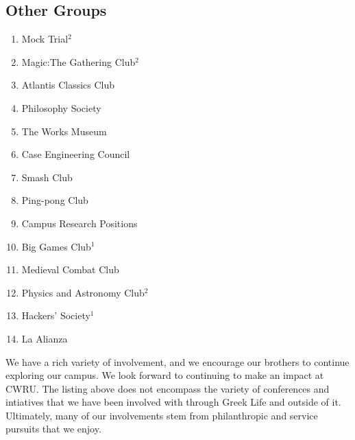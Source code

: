     \subsection*{Other Groups}
      \begin{enumerate}
	\item Mock Trial$^2$
	\item Magic:The Gathering Club$^2$
	\item Atlantis Classics Club
	\item Philosophy Society
	\item The Works Museum
	\item Case Engineering Council
	\item Smash Club
	\item Ping-pong Club
	\item Campus Research Positions
	\item Big Games Club$^1$
	\item Medieval Combat Club
	\item Physics and Astronomy Club$^2$
	\item Hackers' Society$^1$
	\item La Alianza	
      \end{enumerate}

  We have a rich variety of involvement, and we encourage our brothers to continue exploring our campus. We look forward to continuing to make an impact at CWRU. The listing above does not encompass the variety of conferences and intiatives that we have been involved with through Greek Life and outside of it. Ultimately, many of our involvements stem from philanthropic and service pursuits that we enjoy.
